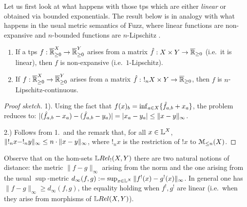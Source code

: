 Let us first look at what happens with those tps which are either \emph{linear} or obtained via bounded exponentials.
The result below is in analogy with what happens in the usual metric semantics of Fuzz, where 
linear functions are non-expansive and $n$-bounded functions are $n$-Lipschitz \cite{Reed2010}.




\begin{proposition}\label{prop:troplinear}
\begin{enumerate}
\item If a tps $f: \overline{\mathbb{R}}_{\geq 0}^{X}\to \overline{\mathbb{R}}_{\geq 0}^{Y}$ arises from a matrix $\hat{f}:X\times Y\to \overline{\mathbb{R}}_{\geq 0}$ (i.e.~it is linear), then $f$ is non-expansive (i.e.\ $1$-Lipschitz).  
\item If  $f: \overline{\mathbb{R}}_{\geq 0}^{X}\to \overline{\mathbb{R}}_{\geq 0}^{Y}$ arises from a matrix $\hat{f}: \ !_{n}X\times Y\to \overline{\mathbb{R}}_{\geq 0}$, then $f$ is $n$-Lipschitz-continuous.
\end{enumerate}
\end{proposition}
\begin{proof}[Proof sketch]
1). Using the fact that $f( x)_{b}= \inf_{a\in X}\{\hat{f}_{a,b}+ x_{a}\}$,
the problem reduces to: $|(\hat{f}_{a,b}- x_{a})- (\hat{f}_{a,b}- y_{a})| = |x_{a}- y_{a}|\leq \lVert x- y\rVert_{\infty}$. %

2.) Follows from 1.~and the remark that, for all $x\in \mathbb{L}^{X}$, $\lVert !_{n} x-!_{n} y\rVert_{\infty}\leq n\cdot \lVert x- y\rVert_{\infty}$, where $!_{n} x$ is the restriction of $! x$ to $\mathcal{M}_{\leq n}(X)$.%
\end{proof} 

Observe that on the hom-sets $\HOM{\LREL_{!}}{X}{Y}$ there are two natural notions of distance: the metric $\| f-g\|_{\infty}$ arising from the norm and the one arising from the usual $\sup$-metric $d_\infty(f,g):=\sup_{x\in \mathbb{L}^{X}} \|f^{!}(x)-g^{!}(x)\|_{\infty}$.
In general one has $\| f-g\|_{\infty}\geq d_\infty(f,g)$, the equality holding when $f^{!},g^{!}$ are linear (i.e.~when they arise from morphisms of $ \LREL(X,Y)$).
 

